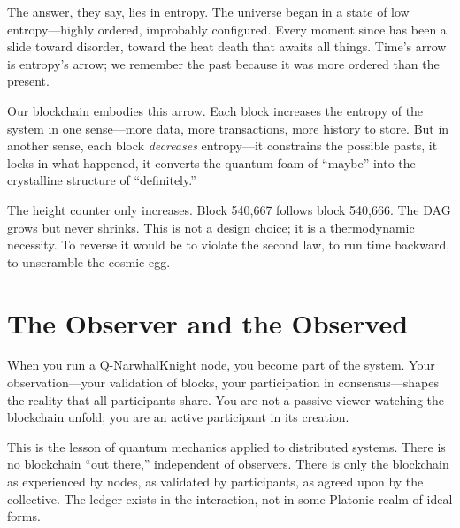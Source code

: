 \documentclass[12pt,a4paper]{article}
\begin{document}
The answer, they say, lies in entropy. The universe began in a state of low entropy---highly ordered, improbably configured. Every moment since has been a slide toward disorder, toward the heat death that awaits all things. Time's arrow is entropy's arrow; we remember the past because it was more ordered than the present.

Our blockchain embodies this arrow. Each block increases the entropy of the system in one sense---more data, more transactions, more history to store. But in another sense, each block \textit{decreases} entropy---it constrains the possible pasts, it locks in what happened, it converts the quantum foam of ``maybe'' into the crystalline structure of ``definitely.''

The height counter only increases. Block 540,667 follows block 540,666. The DAG grows but never shrinks. This is not a design choice; it is a thermodynamic necessity. To reverse it would be to violate the second law, to run time backward, to unscramble the cosmic egg.

\section{The Observer and the Observed}

When you run a Q-NarwhalKnight node, you become part of the system. Your observation---your validation of blocks, your participation in consensus---shapes the reality that all participants share. You are not a passive viewer watching the blockchain unfold; you are an active participant in its creation.

This is the lesson of quantum mechanics applied to distributed systems. There is no blockchain ``out there,'' independent of observers. There is only the blockchain as experienced by nodes, as validated by participants, as agreed upon by the collective. The ledger exists in the interaction, not in some Platonic realm of ideal forms.

\begin{center}
\end{center}
\end{document}
